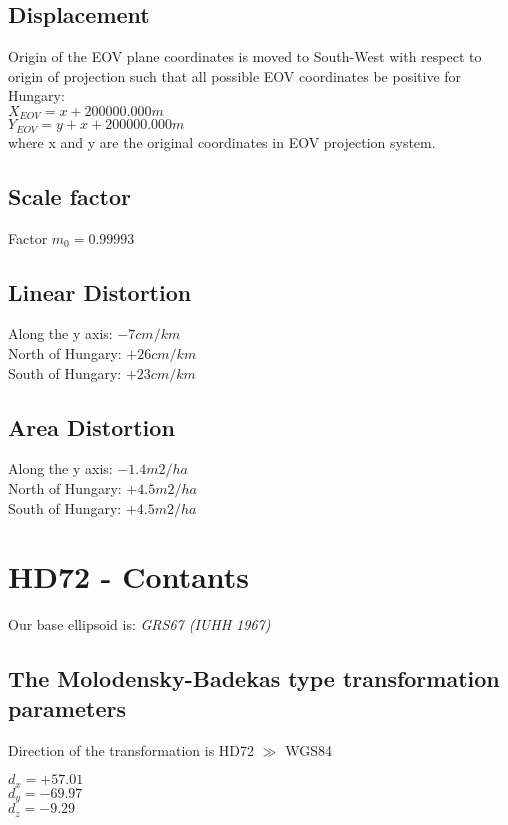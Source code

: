 \documentclass[10pt]{article}
\begin{document}
	\subsection{Displacement}
	Origin of the EOV plane coordinates is moved to South-West with respect to origin of projection 
	such that all possible EOV coordinates be positive for Hungary:
	\\
	$X_{EOV} = x + 200 000.000 m$ \\
	$Y_{EOV} = y + x + 200 000.000 m$ \\
	where x and y are the original coordinates in EOV projection system.
	
	\subsection{Scale factor}
	Factor $m_0 = 0.99993$
	
	\subsection{Linear Distortion}
	Along the y axis: $-7cm/km$ \\
	North of Hungary: $+26cm/km$ \\
	South of Hungary: $+23cm/km$
	
	\subsection{Area Distortion}
	Along the y axis: $-1.4 m2/ha$ \\
	North of Hungary: $+4.5 m2/ha$ \\
	South of Hungary: $+4.5 m2/ha$
	
	
	
\section{HD72 - Contants}\label{hd72}
	Our base ellipsoid is: \emph{GRS67 (IUHH 1967)}
	\subsection{The Molodensky-Badekas type transformation parameters}
	Direction of the transformation is HD72 $\gg$ WGS84 \\
	\begin{center}
		$d_x = +57.01$\\
		$d_y = -69.97$\\
		$d_z = -9.29$\\		
	\end{center}
	
\end{document}
